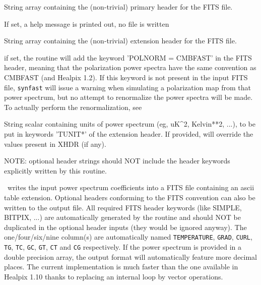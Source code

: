 \begin{keywords}
  \begin{kwlist}{} %
    \item[HDR\mytarget{idl:cl2fits:HDR}%
 =] String array containing the (non-trivial) primary header
      for the FITS file. 
    \item[/HELP\mytarget{idl:cl2fits:HELP}%
] If set, a help message is printed out, no file is written

    \item[XHDR\mytarget{idl:cl2fits:XHDR}%
=] String array containing the (non-trivial) extension header
      for the FITS file. 
    \item[/CMBFAST\mytarget{idl:cl2fits:CMBFAST}%
] if set, the routine will add the keyword 'POLNORM =
    CMBFAST' in the FITS header, meaning that the polarization power spectra
    have the same convention as CMBFAST (and Healpix 1.2). 
    If this keyword is not present in the input FITS file, {\tt synfast} will issue a
    warning when simulating a polarization map from that power spectrum, but no
    attempt to renormalize the power spectra will be made. To actually perform
    the renormalization, see 
    \item[UNITS\mytarget{idl:cl2fits:UNITS}%
=] String scalar containing units of power spectrum (eg, uK{\^{}}2,
         Kelvin**2, ...), to be put in keywords 'TUNIT*' of the extension header. 
         If provided, will override the values present in XHDR (if any).
    \item[ ] NOTE: optional header strings should NOT include the
      header keywords explicitly written by this routine.

  \end{kwlist}
\end{keywords}  

\begin{codedescription}
{\thedocid\ writes the input power spectrum coefficients into a FITS
file containing an ascii table extension. Optional headers conforming
to the FITS convention can also be written to the output file. All
required FITS header keywords (like SIMPLE, BITPIX, ...) are automatically generated by the
routine and should NOT be duplicated in the optional header inputs
(they would be ignored anyway).
The one/four/six/nine column(s) are automatically named 
{\tt TEMPERATURE}, {\tt GRAD}, {\tt CURL}, {\tt TG}, {\tt TC}, {\tt GC}, {\tt GT}, {\tt CT} and {\tt CG} respectively.
If the power spectrum is provided in a double precision array, the output format
will automatically feature more decimal places.
The current implementation is much faster than the one available in
Healpix 1.10 thanks to replacing an internal loop by vector operations.}
\end{codedescription}




